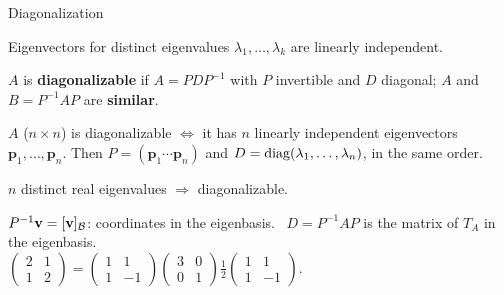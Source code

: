 \documentclass[aspectratio=1610,11pt]{beamer}
\begin{document}

\begin{frame}{Diagonalization}
    \begin{theorem}
        \small Eigenvectors for distinct eigenvalues $\lambda_1, \ldots, \lambda_k$ are linearly independent.
    \end{theorem}
    \small $A$ is \textbf{diagonalizable} if $A = PDP^{-1}$ with $P$ invertible and $D$ diagonal; $A$ and $B = P^{-1}AP$ are \textbf{similar}.
    \begin{theorem}
        \small $A$ ($n \times n$) is diagonalizable $\iff$ it has $n$ linearly independent eigenvectors $\mathbf{p}_1, \ldots, \mathbf{p}_n$. Then $P = (\mathbf{p}_1 \cdots \mathbf{p}_n)$ and $D = \operatorname{diag}(\lambda_1, \ldots, \lambda_n)$, in the same order.
    \end{theorem}
    \begin{corollary}
        \small $n$ distinct real eigenvalues $\Rightarrow$ diagonalizable.
    \end{corollary}
    \small
    $P^{-1}\mathbf{v} = [\mathbf{v}]_{\mathcal{B}}$: coordinates in the eigenbasis. \ $D = P^{-1}AP$ is the matrix of $T_A$ in the eigenbasis. \\
    $\begin{pmatrix} 2 & 1 \\ 1 & 2 \end{pmatrix} = \begin{pmatrix} 1 & 1 \\ 1 & -1 \end{pmatrix}\begin{pmatrix} 3 & 0 \\ 0 & 1 \end{pmatrix}\frac{1}{2}\begin{pmatrix} 1 & 1 \\ 1 & -1 \end{pmatrix}$.
\end{frame}

\end{document}
